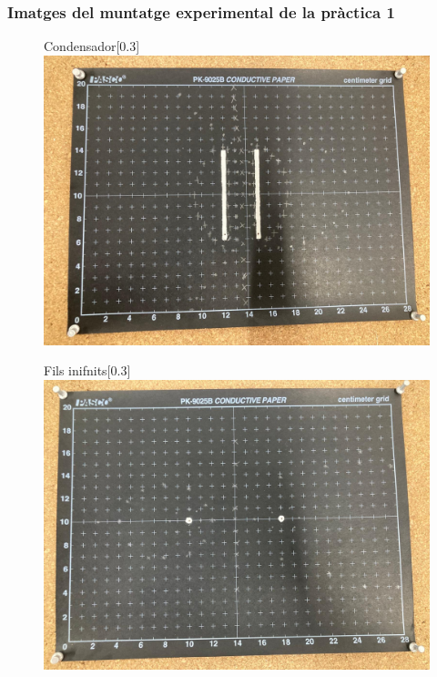 \documentclass[11pt]{article}
\numberwithin{equation}{section}
\numberwithin{figure}{section}
\numberwithin{table}{section}
\begin{document}
\subsubsection{Imatges del muntatge experimental de la pràctica 1}\label{fotos}
\begin{figure}[H]
    \centering

    \begin{subcaptionbox}{Condensador\label{fig:img1}}[0.3\textwidth]
        {\includegraphics[width=\linewidth]{imatge1.jpg}}
    \end{subcaptionbox}
    \hfill
    \begin{subcaptionbox}{Fils inifnits\label{fig:img2}}[0.3\textwidth]
        {\includegraphics[width=\linewidth]{imatge2.jpg}}

\end{subcaptionbox}
\end{figure}
\end{document}
